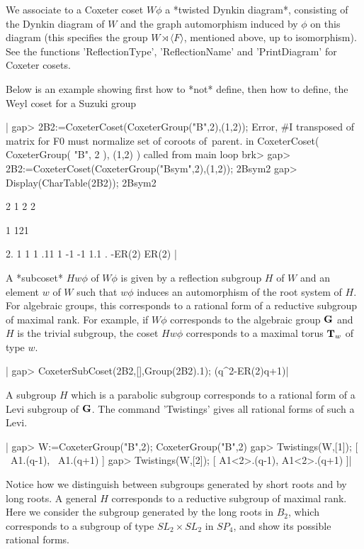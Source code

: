We  associate  to  a  Coxeter  coset  $W\phi$  a  *twisted Dynkin diagram*,
consisting  of the Dynkin diagram of $W$ and the graph automorphism induced
by  $\phi$  on  this  diagram  (this  specifies  the group $W\rtimes\langle
F\rangle$,   mentioned  above,  up  to   isomorphism).  See  the  functions
'ReflectionType', 'ReflectionName' and 'PrintDiagram' for Coxeter cosets.

Below  is an example showing first how to *not* define, then how to define,
the Weyl coset for a Suzuki group\:

|    gap> 2B2:=CoxeterCoset(CoxeterGroup("B",2),(1,2));
    Error, #I transposed of matrix for F0 must normalize set of coroots of\
     parent.
     in
    CoxeterCoset( CoxeterGroup( "B", 2 ), (1,2) ) called from
    main loop
    brk>
    gap> 2B2:=CoxeterCoset(CoxeterGroup("Bsym",2),(1,2));
    2Bsym2
    gap> Display(CharTable(2B2));
    2Bsym2
    
         2 1      2     2
    
                  1   121
    
    2.     1      1     1
    .11    1     -1    -1
    1.1    . -ER(2) ER(2)
    |

A  *subcoset* $Hw\phi$ of $W\phi$ is given  by a reflection subgroup $H$ of
$W$  and an element $w$ of $W$ such that $w\phi$ induces an automorphism of
the  root  system  of  $H$.  For  algebraic  groups,  this corresponds to a
rational  form of  a reductive  subgroup of  maximal rank.  For example, if
$W\phi$  corresponds to  the algebraic  group ${\bf G}$  and $H$ is the trivial
subgroup, the coset $Hw\phi$ corresponds to a maximal torus ${\bf T}_w$ of type
$w$.

|    gap> CoxeterSubCoset(2B2,[],Group(2B2).1);
    (q^2-ER(2)q+1)|

A subgroup $H$ which is a parabolic subgroup corresponds to a rational form
of  a Levi  subgroup of  ${\bf G}$. The  command 'Twistings'  gives all rational
forms of such a Levi. 

|    gap> W:=CoxeterGroup("B",2);
    CoxeterGroup("B",2)
    gap> Twistings(W,[1]);  
    [ ~A1.(q-1), ~A1.(q+1) ]
    gap> Twistings(W,[2]);
    [ A1<2>.(q-1), A1<2>.(q+1) ]|

Notice how we distinguish between subgroups generated by short roots and by
long  roots. A general  $H$ corresponds to  a reductive subgroup of maximal
rank.  Here we consider the subgroup generated  by the long roots in $B_2$,
which  corresponds to a  subgroup of type  $SL_2\times SL_2$ in $SP_4$, and
show its possible rational forms.

